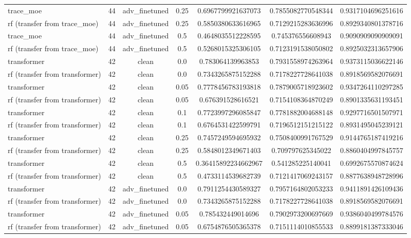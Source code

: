 \begin{table}[htbp]
\begin{tabular}{lcccccc}
trace\_moe & 44 & adv\_finetuned & 0.25 & 0.6967799921637073 & 0.7855082770548344 & 0.9317104696251616 \\
rf (transfer from trace\_moe) & 44 & adv\_finetuned & 0.25 & 0.5850380633616965 & 0.7129215283636996 & 0.8929340801378716 \\
trace\_moe & 44 & adv\_finetuned & 0.5 & 0.4648035512228595 & 0.745376556608943 & 0.9090909090909091 \\
rf (transfer from trace\_moe) & 44 & adv\_finetuned & 0.5 & 0.5268015325306105 & 0.7123191538050802 & 0.8925032313657906 \\
transformer & 42 & clean & 0.0 & 0.783064139963853 & 0.7931558974263964 & 0.9373115036622146 \\
rf (transfer from transformer) & 42 & clean & 0.0 & 0.7343265875152288 & 0.7178227728641038 & 0.8918569582076691 \\
transformer & 42 & clean & 0.05 & 0.7778456783193818 & 0.7879005718923602 & 0.9347264110297285 \\
rf (transfer from transformer) & 42 & clean & 0.05 & 0.676391528616521 & 0.7154108364870249 & 0.8901335631193451 \\
transformer & 42 & clean & 0.1 & 0.7723997296085847 & 0.7781882004688148 & 0.9297716501507971 \\
rf (transfer from transformer) & 42 & clean & 0.1 & 0.6764531422599791 & 0.7196512151215122 & 0.8931495045239121 \\
transformer & 42 & clean & 0.25 & 0.7457249594695932 & 0.7508400991767529 & 0.9144765187419216 \\
rf (transfer from transformer) & 42 & clean & 0.25 & 0.5848012349671403 & 0.709797625345022 & 0.8860404997845757 \\
transformer & 42 & clean & 0.5 & 0.36415892234662967 & 0.541285225140041 & 0.6992675570874624 \\
rf (transfer from transformer) & 42 & clean & 0.5 & 0.4733114539682739 & 0.7121417069243157 & 0.8877638948728996 \\
transformer & 42 & adv\_finetuned & 0.0 & 0.7911254430589327 & 0.7957164802053233 & 0.9411891426109436 \\
rf (transfer from transformer) & 42 & adv\_finetuned & 0.0 & 0.7343265875152288 & 0.7178227728641038 & 0.8918569582076691 \\
transformer & 42 & adv\_finetuned & 0.05 & 0.785432449014696 & 0.7902973200697669 & 0.9386040499784576 \\
rf (transfer from transformer) & 42 & adv\_finetuned & 0.05 & 0.6754876505365378 & 0.7151114010855533 & 0.8899181387333046 \\

\end{tabular}
\end{table}
